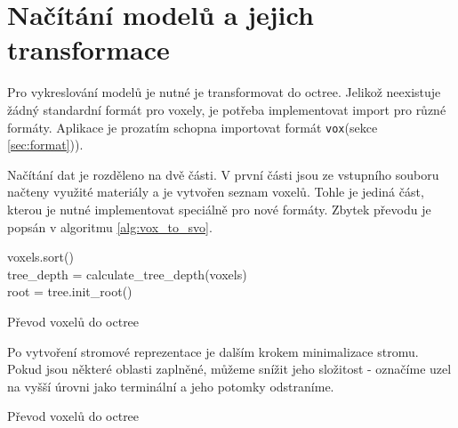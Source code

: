 \section{Načítání modelů a jejich transformace} \label{sec:voxel_conversion}
Pro vykreslování modelů je nutné je transformovat do octree. Jelikož neexistuje žádný standardní formát pro voxely, je potřeba implementovat import pro různé formáty. Aplikace je prozatím schopna importovat formát \texttt{vox}(sekce \ref{sec:format})).

Načítání dat je rozděleno na dvě části. V první části jsou ze vstupního souboru načteny využité materiály a je vytvořen seznam voxelů. Tohle je jediná část, kterou je nutné implementovat speciálně pro nové formáty. Zbytek převodu je popsán v algoritmu \ref{alg:vox_to_svo}.


\begin{center}
	\begin{czechalgorithm}[H] \label{alg:vox_to_svo}
		voxels.sort() \\
		tree\_depth = calculate\_tree\_depth(voxels)\\
		root = tree.init\_root()\\
		\caption{Převod voxelů do octree}
	\end{czechalgorithm}
\end{center}

Po vytvoření stromové reprezentace je dalším krokem minimalizace stromu. Pokud jsou některé oblasti zaplněné, můžeme snížit jeho složitost - označíme uzel na vyšší úrovni jako terminální a jeho potomky odstraníme.

\begin{center}
	\begin{czechalgorithm}[H] \label{alg:minimize_svo}


		\caption{Převod voxelů do octree}
	\end{czechalgorithm}
\end{center}


